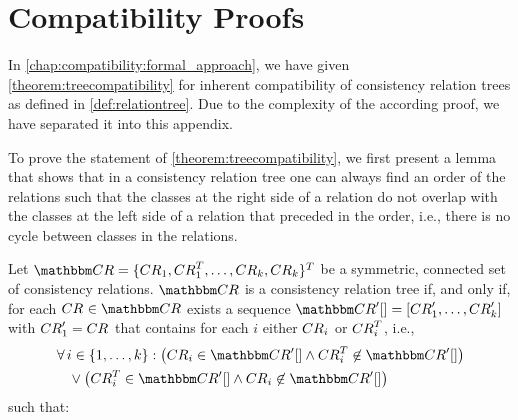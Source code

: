 \chapter{Compatibility Proofs}
\label{chap:appendix:compatibility_proofs}

In \autoref{chap:compatibility:formal_approach}, we have given \autoref{theorem:treecompatibility} for inherent compatibility of consistency relation trees as defined in \autoref{def:relationtree}.
Due to the complexity of the according proof, we have separated it into this appendix.

To prove the statement of \autoref{theorem:treecompatibility}, we first present a lemma that shows that in a consistency relation tree one can always find an order of the relations such that the classes at the right side of a relation do not overlap with the classes at the left side of a relation that preceded in the order, i.e., there is no cycle between classes in the relations.

\begin{lemma} \label{lemma:treehassequence}
    Let $\consistencyrelationset{CR} = \setted{\consistencyrelation{CR}{1}, \consistencyrelation{CR}{1}^T, \dots, \consistencyrelation{CR}{k}, \consistencyrelation{CR}{k}}^T$ be a symmetric, connected set of consistency relations.
    $\consistencyrelationset{CR}$ is a consistency relation tree if, and only if, for each $\consistencyrelation{CR}{} \in \consistencyrelationset{CR}$ exists a sequence $\sequence{\consistencyrelationset{CR}'} = \sequenced{\consistencyrelation{CR}{1}', \dots, \consistencyrelation{CR}{k}'}$ with $\consistencyrelation{CR}{1}' = \consistencyrelation{CR}{}$ that contains for each $i$ either $\consistencyrelation{CR}{i}$ or $\consistencyrelation{CR}{i}^T$, i.e.,
    \begin{align*}
        &
        \forall i \in \setted{1, \dots, k} :
        \bigl( \consistencyrelation{CR}{i} \in \sequence{\consistencyrelationset{CR}'}
        \land \consistencyrelation{CR}{i}^T \not\in \sequence{\consistencyrelationset{CR}'}
        \bigl)\\
        & \formulaskip 
        \lor \bigl(\consistencyrelation{CR}{i}^T \in \sequence{\consistencyrelationset{CR}'}
        \land \consistencyrelation{CR}{i} \not\in \sequence{\consistencyrelationset{CR}'}
        \bigl)
    \end{align*}
    such that:
\end{lemma}

